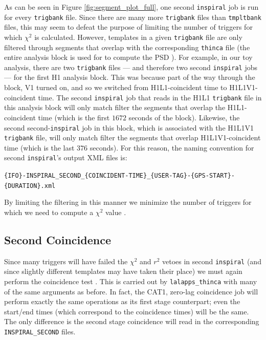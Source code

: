 As can be seen in Figure \ref{fig:segment_plot_full}, one second
\texttt{inspiral} job is run for every \texttt{trigbank} file. Since there are
many more \texttt{trigbank} files than \texttt{tmpltbank} files, this may seem
to defeat the purpose of limiting the number of triggers for which $\chi^2$ is
calculated. However, templates in a given \texttt{trigbank} file are only
filtered through segments that overlap with the corresponding \texttt{thinca}
file  (the entire analysis block is used for to compute the \ac{PSD}
\cite{brown-2005-22}). For example, in our toy analysis, there are two
\texttt{trigbank} files --- and therefore two second \texttt{inspiral} jobs ---
for the first H1 analysis block. This was because part of the way through the
block, V1 turned on, and so we switched from H1L1-coincident time to
H1L1V1-coincident time. The second \texttt{inspiral} job that reads in the H1L1
\texttt{trigbank} file in this analysis block will only match filter the
segments that overlap the H1L1-coincident time (which is the first $1672$
seconds of the block). Likewise, the second second-\texttt{inspiral} job in
this block, which is associated with the H1L1V1 \texttt{trigbank} file, will
only match filter the segments that overlap H1L1V1-coincident time (which is
the last $376$ seconds). For this reason, the naming convention for second
\texttt{inspiral}'s output XML files is:
\begin{center}
\texttt{\{IFO\}-INSPIRAL\_SECOND\_\{COINCIDENT-TIME\}\_\{USER-TAG\}-\{GPS-START\}-\{DURATION\}.xml}
\end{center}
By limiting the filtering in this manner we minimize the number of triggers for
which we need to compute a $\chi^2$ value \cite{brown-2005-22}.

\subsection{Second Coincidence}
\label{sec:second_thinca}

Since many triggers will have failed the $\chi^2$ and $r^2$ vetoes in second
\texttt{inspiral} (and since slightly different templates may have taken their
place) we must again perform the coincidence test \cite{Keppel:thesis}. This is
carried out by \texttt{lalapps\_thinca} with many of the same arguments as
before. In fact, the CAT1, zero-lag coincidence job will perform exactly the
same operations as its first stage counterpart; even the start/end times (which
correspond to the coincidence times) will be the same. The only difference is
the second stage coincidence will read in the corresponding
\texttt{INSPIRAL\_SECOND} files.

